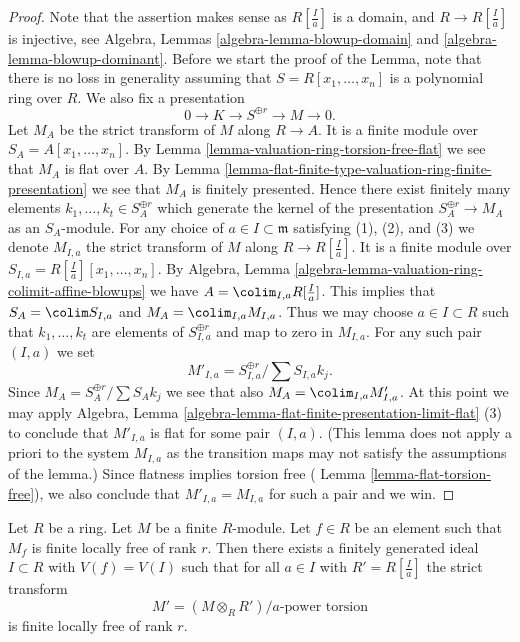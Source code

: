 \begin{proof}
Note that the assertion makes sense as $R[\frac{I}{a}]$
is a domain, and $R \to R[\frac{I}{a}]$ is injective, see
Algebra, Lemmas \ref{algebra-lemma-blowup-domain} and
\ref{algebra-lemma-blowup-dominant}.
Before we start the proof of the Lemma, note that there is
no loss in generality assuming that $S = R[x_1, \ldots, x_n]$
is a polynomial ring over $R$. We also fix a presentation
$$
0 \to K \to S^{\oplus r} \to M \to 0.
$$
Let $M_A$ be the strict transform of $M$ along $R \to A$. It is a finite
module over $S_A = A[x_1, \ldots, x_n]$. By
Lemma \ref{lemma-valuation-ring-torsion-free-flat}
we see that $M_A$ is flat over $A$. By
Lemma \ref{lemma-flat-finite-type-valuation-ring-finite-presentation}
we see that $M_A$ is finitely presented. Hence there exist finitely many
elements $k_1, \ldots, k_t \in S_A^{\oplus r}$ which generate the
kernel of the presentation $S_A^{\oplus r} \to M_A$ as
an $S_A$-module. For any choice of $a \in I \subset \mathfrak m$
satisfying (1), (2), and (3) we denote $M_{I, a}$ the strict transform of
$M$ along $R \to R[\frac{I}{a}]$. It is a finite module over
$S_{I, a} = R[\frac{I}{a}][x_1, \ldots, x_n]$. By
Algebra, Lemma \ref{algebra-lemma-valuation-ring-colimit-affine-blowups}
we have $A = \colim_{I, a} R[\frac{I}{a}]$.
This implies that $S_A = \colim S_{I, a}$ and
$M_A = \colim_{I, a} M_{I, a}$.
Thus we may choose $a \in I \subset R$ such that
$k_1, \ldots, k_t$ are elements of $S_{I, a}^{\oplus r}$ and
map to zero in $M_{I, a}$. For any such pair $(I, a)$ we set
$$
M'_{I, a} = S_{I, a}^{\oplus r}/ \sum S_{I, a}k_j.
$$
Since $M_A = S_A^{\oplus r}/ \sum S_Ak_j$ we see that also
$M_A = \colim_{I, a} M'_{I, a}$.
At this point we may apply
Algebra, Lemma \ref{algebra-lemma-flat-finite-presentation-limit-flat} (3)
to conclude that $M'_{I, a}$ is flat for some pair $(I, a)$.
(This lemma does not apply a priori to the system $M_{I, a}$
as the transition maps may not satisfy the assumptions of the lemma.)
Since flatness implies torsion free (
Lemma \ref{lemma-flat-torsion-free}),
we also conclude that $M'_{I, a} = M_{I, a}$ for such a pair and we win.
\end{proof}

\begin{lemma}
\label{lemma-blowup-module}
Let $R$ be a ring. Let $M$ be a finite $R$-module. Let $f \in R$
be an element such that $M_f$ is finite locally free of rank $r$.
Then there exists a finitely generated ideal $I \subset R$ with
$V(f) = V(I)$ such that for all $a \in I$ with $R' = R[\frac{I}{a}]$
the strict transform
$$
M' = (M \otimes_R R')/a\text{-power torsion}
$$
is finite locally free of rank $r$.
\end{lemma}


